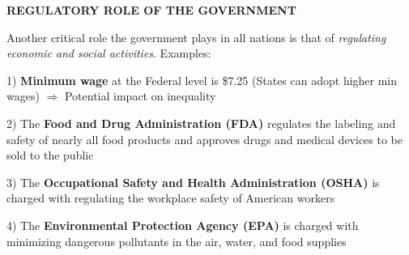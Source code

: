 \documentclass[landscape]{slides}
\begin{document}
\begin{slide}

\end{slide}

\begin{slide}
\begin{center}
{\bf REGULATORY ROLE OF THE GOVERNMENT}
\end{center}

Another critical role the government plays in all nations is that of \emph{regulating economic and social activities}.
Examples:

1) \textbf{Minimum wage} at the Federal level is \$7.25 (States can adopt higher min wages) $\Rightarrow$ 
Potential impact on inequality 

2) The \textbf{Food and Drug Administration (FDA)} regulates the labeling and safety of nearly all food products 
and approves drugs and medical devices to be sold to the public

3) The \textbf{Occupational Safety and Health Administration (OSHA)} is charged with regulating the workplace safety of 
American workers

4) The \textbf{Environmental Protection Agency (EPA)} is charged with minimizing dangerous pollutants in the air, water, and food supplies
\end{slide}
\end{document}
